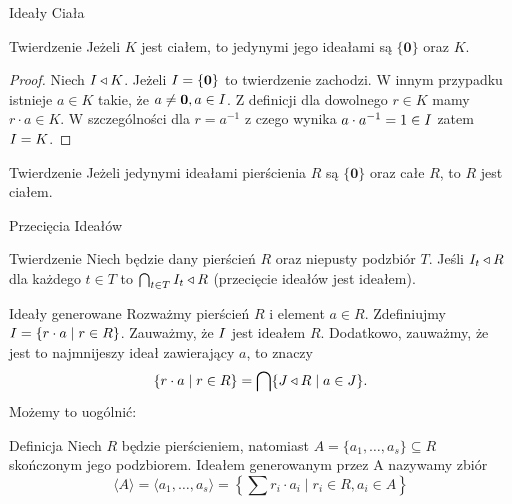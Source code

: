 \documentclass{beamer}
\newcommand{\zero}{\mathbf{0}}
\newcommand{\II}{\mathnormal{I}}
\newcommand{\JJ}{\mathnormal{J}}
\begin{document}
\begin{frame}{Ideały Ciała}
    \begin{block}{Twierdzenie}
        Jeżeli $K$ jest ciałem, to jedynymi jego ideałami są $\{\zero\}$ oraz $K$.
    \end{block}
    \pause 
    \begin{proof}
        Niech $\II \triangleleft K$. Jeżeli $\II = \{\zero\}$ to twierdzenie zachodzi. W innym przypadku istnieje $a \in K$ takie, że $a \neq \zero, a \in \II$. Z definicji dla dowolnego $r \in K$ mamy $r \cdot a \in K$. W szczególności dla $r = a^{-1}$ z czego wynika $a \cdot a^{-1} = 1 \in \II$ zatem $\II = K$.
    \end{proof}
    \pause 
    \begin{block}{Twierdzenie}
        Jeżeli jedynymi ideałami pierścienia $R$ są $\{\zero\}$ oraz całe $R$, to $R$ jest ciałem. 
    \end{block}
\end{frame}

\begin{frame}{Przecięcia Ideałów}
    \begin{block}{Twierdzenie}
        Niech będzie dany pierścień $R$ oraz niepusty podzbiór $T$. 
        Jeśli $\II_t \triangleleft R$ dla każdego $t \in T$ to $\bigcap_{t \in T} \II_t \triangleleft R$
        (przecięcie ideałów jest ideałem).
    \end{block}
\end{frame}

\begin{frame}{Ideały generowane}
    Rozważmy pierścień $R$ i element $a \in R$. Zdefiniujmy $\II = \{ r \cdot a \mid r \in R\}$. Zauważmy, że $\II$ jest ideałem $R$. Dodatkowo, zauważmy, że jest to najmnijeszy ideał zawierający $a$, to znaczy
    $$\{r \cdot a \mid r \in R\} = \bigcap \{\JJ \triangleleft R \mid a \in \JJ\}.$$
    \pause 
    Możemy to uogólnić:
    \begin{block}{Definicja}
        Niech $R$ będzie pierścieniem, natomiast $A = \{a_1, \ldots, a_s\} \subseteq R$ skończonym jego podzbiorem. 
        \alert{Ideałem generowanym przez A} nazywamy zbiór 
        $$\langle A \rangle = \langle a_1, \ldots , a_s \rangle = \left\{ \sum r_i \cdot a_i \mid r_i \in R, a_i \in A \right\}$$
    \end{block}
\end{frame}
\end{document}
